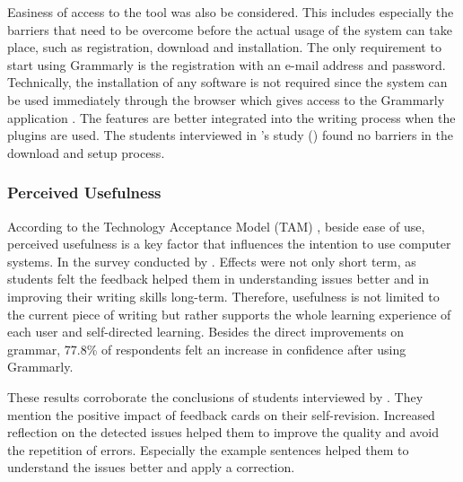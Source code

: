 \documentclass[runningheads]{llncs}
\let\OldTextregistered\textregistered
\renewcommand{\textregistered}{\OldTextregistered\xspace}
\begin{document}
Easiness of access to the tool was also be considered. This includes especially the barriers that need to be overcome before the actual usage of the system can take place, such as registration, download and installation. The only requirement to start using Grammarly\textregistered is the registration with an e-mail address and password. Technically, the installation of any software is not required since the system can be used immediately through the browser which gives access to the Grammarly\textregistered application \citep{noauthor_grammarly_nodate}. The features are better integrated into the writing process when the plugins are used. The students interviewed in \citeauthor{nova_utilizing_2018}'s study (\citeyear{nova_utilizing_2018}) found no barriers in the download and setup process.

\subsubsection{Perceived Usefulness} 
According to the Technology Acceptance Model (TAM) \citep{davis_user_1989}, beside ease of use, perceived usefulness is a key factor that influences the intention to use computer systems. In the survey conducted by \citeauthor{cavaleri_you_2016} . Effects were not only short term, as students felt the feedback helped them in understanding issues better and in improving their writing skills long-term. Therefore, usefulness is not limited to the current piece of writing but rather supports the whole learning experience of each user and self-directed learning. Besides the direct improvements on grammar, 77.8\% of respondents felt an increase in confidence after using Grammarly\textregistered. 

These results corroborate the conclusions of students interviewed by \textcite{nova_utilizing_2018}. They mention the positive impact of feedback cards on their self-revision. Increased reflection on the detected issues helped them to improve the quality and avoid the repetition of errors. Especially the example sentences helped them to understand the issues better and apply a correction.
\end{document}
